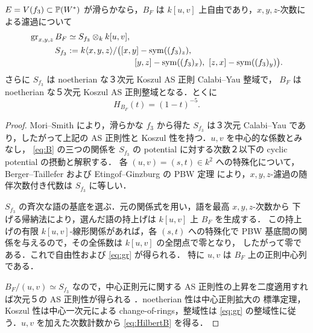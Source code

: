\begin{lemma}\label{lem:pbw}
$E=V(f_3)\subset\mathbb P(W^*)$ が滑らかなら，$B_F$ は
$k[u,v]$ 上自由であり，$x,y,z$-次数による濾過について
\begin{align}\label{eq:gr}
 \gr_{x,y,z}B_F&\simeq S_{f_3}\otimes_k k[u,v],\\
 S_{f_3}&:=k\langle x,y,z\rangle/\bigl([x,y]-\Symm((f_3)_z),\ 
\notag\\[-2pt]
 &\hspace{8em}[y,z]-\Symm((f_3)_x),\ [z,x]-\Symm((f_3)_y)\bigr).
\end{align}
さらに $S_{f_3}$ は noetherian な３次元 Koszul AS 正則 Calabi--Yau 整域で，
$B_F$ は noetherian な５次元 Koszul AS 正則整域となる．とくに
\begin{equation}\label{eq:HilbertB}
 H_{B_F}(t)=(1-t)^{-5}.
\end{equation}
\end{lemma}
\begin{proof}
Mori--Smith \cite[Theorem~4.2(1)]{MS} により，滑らかな $f_3$ から得た
$S_{f_3}$ は３次元 Calabi--Yau であり，したがって上記の
AS 正則性と Koszul 性を持つ．$u,v$ を中心的な係数とみなし，
\eqref{eq:B} の三つの関係を
$S_{f_3}$ の potential に対する次数２以下の cyclic potential の摂動と解釈する．
各 $(u,v)=(s,t)\in k^2$ への特殊化について，
Berger--Taillefer および Etingof--Ginzburg の PBW 定理
\cite[Proposition~7.3.1(ii)]{EG} により，$x,y,z$-濾過の随伴次数付き代数は
$S_{f_3}$ に等しい．

$S_{f_3}$ の斉次な語の基底を選ぶ．元の関係式を用い，語を最高 $x,y,z$-次数から
下げる帰納法により，選んだ語の持上げは $k[u,v]$ 上 $B_F$ を生成する．
この持上げの有限 $k[u,v]$-線形関係があれば，各 $(s,t)$ への特殊化で
PBW 基底間の関係を与えるので，その全係数は $k[u,v]$ の全閉点で零となり，
したがって零である．これで自由性および \eqref{eq:gr} が得られる．
特に $u,v$ は $B_F$ 上の正則中心列である．

$B_F/(u,v)\simeq S_{f_3}$ なので，中心正則元に関する
AS 正則性の上昇を二度適用すれば次元５の AS 正則性が得られる
\cite[Propositions~2.1, 2.3]{CKS}．noetherian 性は中心正則拡大の
標準定理，Koszul 性は中心一次元による change-of-rings，整域性は
\eqref{eq:gr} の整域性に従う．$u,v$ を加えた次数計数から \eqref{eq:HilbertB} を得る．
\end{proof}

